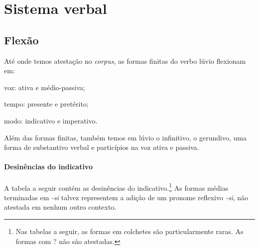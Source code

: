 
\section{Sistema verbal}

\subsection{Flexão}

Até onde temos atestação no \emph{corpus}, as formas finitas do verbo lúvio
flexionam em:
\begin{inparaenum}[(a)]
	\item voz: ativa e médio-passiva;
	\item tempo: presente e pretérito;
	\item modo: indicativo e imperativo.
\end{inparaenum}
Além das formas finitas, também temos em lúvio o infinitivo, o gerundivo, uma
forma de substantivo verbal e particípios na voz ativa e passiva.

\paragraph{Desinências do indicativo}
A tabela a seguir contém as desinências do indicativo.\footnote{Nas tabelas a
	seguir, as formas em colchetes são particularmente raras. As formas com {?} não
	são atestadas.}
As formas médias terminadas em \emph{-si} talvez representem a adição de um
pronome reflexivo \emph{-si}, não atestada em nenhum outro contexto.

